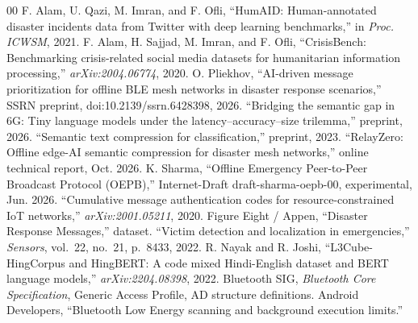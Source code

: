 \documentclass[conference]{IEEEtran}
\begin{document}
\begin{thebibliography}{00}
 F. Alam, U. Qazi, M. Imran, and F. Ofli, ``HumAID:
Human-annotated disaster incidents data from Twitter with deep learning
benchmarks,'' in \emph{Proc. ICWSM}, 2021.
 F. Alam, H. Sajjad, M. Imran, and F. Ofli,
``CrisisBench: Benchmarking crisis-related social media datasets for
humanitarian information processing,'' \emph{arXiv:2004.06774}, 2020.
 O. Pliekhov, ``AI-driven message prioritization for offline
BLE mesh networks in disaster response scenarios,'' SSRN preprint,
doi:10.2139/ssrn.6428398, 2026.
 ``Bridging the semantic gap in 6G: Tiny language models under
the latency--accuracy--size trilemma,'' preprint, 2026.
 ``Semantic text compression for classification,'' preprint,
2023.
 ``RelayZero: Offline edge-AI semantic compression for
disaster mesh networks,'' online technical report, Oct. 2026.
 K. Sharma, ``Offline Emergency Peer-to-Peer Broadcast Protocol
(OEPB),'' Internet-Draft draft-sharma-oepb-00, experimental, Jun. 2026.
 ``Cumulative message authentication codes for
resource-constrained IoT networks,'' \emph{arXiv:2001.05211}, 2020.
 Figure Eight / Appen, ``Disaster Response Messages,'' dataset.
 ``Victim detection and localization in emergencies,''
\emph{Sensors}, vol.~22, no.~21, p.~8433, 2022.
 R. Nayak and R. Joshi, ``L3Cube-HingCorpus and HingBERT: A
code mixed Hindi-English dataset and BERT language models,''
\emph{arXiv:2204.08398}, 2022.
 Bluetooth SIG, \emph{Bluetooth Core Specification}, Generic
Access Profile, AD structure definitions.
 Android Developers, ``Bluetooth Low Energy scanning and
background execution limits.''
\end{thebibliography}
\end{document}
